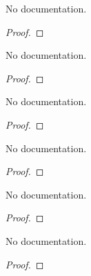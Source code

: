 \begin{lemma}\label{sub_normsquare_gradient}
        \leanok
                No documentation.
    \end{lemma}

\begin{proof}
    \leanok
\end{proof}

\begin{lemma}\label{gradient_continuous_of_contdiff}
        \leanok
                No documentation.
    \end{lemma}

\begin{proof}
    \leanok
\end{proof}

\begin{lemma}\label{expansion}
        \leanok
                No documentation.
    \end{lemma}

\begin{proof}
    \leanok
\end{proof}

\begin{lemma}\label{general_expansion}
        \leanok
                No documentation.
    \end{lemma}

\begin{proof}
    \leanok
\end{proof}

\begin{theorem}\label{lagrange}
        \leanok
                No documentation.
    \end{theorem}

\begin{proof}
    \leanok
\end{proof}

\begin{lemma}\label{Vert_abs}
        \leanok
                No documentation.
    \end{lemma}

\begin{proof}
    \leanok
\end{proof}

